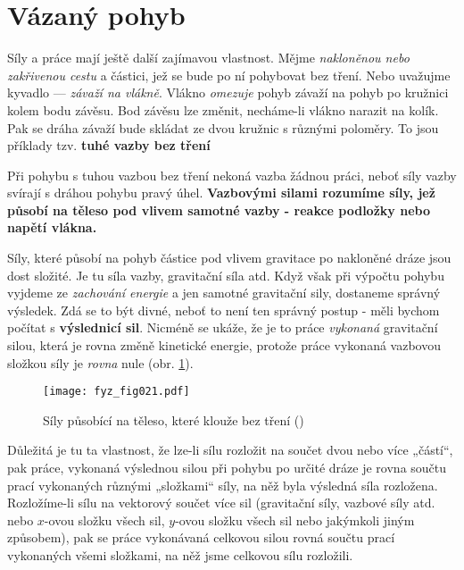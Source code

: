 {  \section{Vázaný pohyb}
    Síly a práce mají ještě další zajímavou vlastnost. Mějme \emph{nakloněnou nebo zakřivenou 
    cestu} a částici, jež se bude po ní pohybovat bez tření. Nebo uvažujme kyvadlo — \emph{závaží 
    na vlákně}. Vlákno \emph{omezuje} pohyb závaží na pohyb po kružnici kolem bodu závěsu. Bod 
    závěsu lze změnit, necháme-li vlákno narazit na kolík. Pak se dráha závaží bude skládat ze dvou 
    kružnic s různými poloměry. To jsou příklady tzv. \textbf{tuhé vazby bez tření}
    
    Při pohybu s tuhou vazbou bez tření nekoná vazba žádnou práci, neboť síly vazby svírají s 
    dráhou pohybu pravý úhel. \textbf{Vazbovými silami rozumíme síly, jež působí na těleso pod 
    vlivem samotné vazby - reakce podložky nebo napětí vlákna.}
    
    Síly, které působí na pohyb částice pod vlivem gravitace po nakloněné dráze jsou dost složité. 
    Je tu síla vazby, gravitační síla atd. Když však při výpočtu pohybu vyjdeme ze \emph{zachování 
    energie} a jen samotné gravitační sily, dostaneme správný výsledek. Zdá se to být divné, neboť 
    to není ten správný postup - měli bychom počítat s \textbf{výslednicí sil}. Nicméně se ukáže, 
    že je to práce \emph{vykonaná} gravitační silou, která je rovna změně kinetické energie, 
    protože práce vykonaná vazbovou složkou síly je \emph{rovna} nule (obr. \ref{fyz:fig021}).
  
    \begin{figure}[ht!]  %
      \centering
      \texttt{[image: fyz\_fig021.pdf]}
      \caption{Síly působící na těleso, které klouže bez tření (\cite[s.~201]{Feynman01})}
      \label{fyz:fig021}
    \end{figure}
    Důležitá je tu ta vlastnost, že lze-li sílu rozložit na součet dvou nebo více „částí“, pak 
    práce, vykonaná výslednou silou při pohybu po určité dráze je rovna součtu prací vykonaných 
    různými „složkami“ síly, na něž byla výsledná síla rozložena. Rozložíme-li sílu na vektorový 
    součet více sil (gravitační síly, vazbové síly atd. nebo \(x\)-ovou složku všech sil, 
    \(y\)-ovou složku všech sil nebo jakýmkoli jiným způsobem), pak se práce vykonávaná celkovou 
    silou rovná součtu prací vykonaných všemi složkami, na něž jsme celkovou sílu rozložili.
  
}
